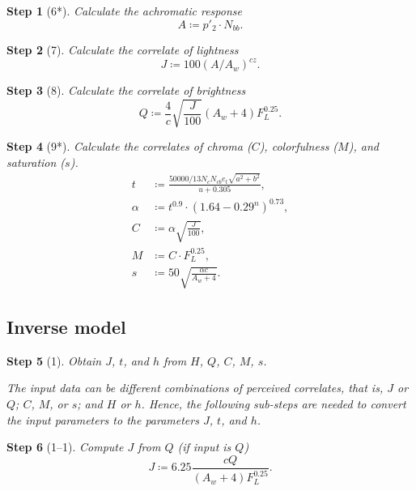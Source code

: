 \documentclass[twocolumn]{scrartcl}
\theoremstyle{named}
\newtheorem*{step}{Step}
\begin{document}
\begin{step}[6*]
Calculate the achromatic response
\[
  A\coloneqq p'_2 \cdot N_{bb}.
  \]
\end{step}

\begin{step}[7]
Calculate the correlate of lightness
\[
  J \coloneqq 100 {(A / A_w)}^{cz}.
\]
\end{step}

\begin{step}[8]
  Calculate the correlate of brightness
  \[
    Q \coloneqq \frac{4}{c} \sqrt{\frac{J}{100}} (A_w+4) F_L^{0.25}.
    \]
\end{step}

\begin{step}[9*]
Calculate the correlates of chroma ($C$), colorfulness ($M$), and saturation
  ($s$).
\begin{align*}
  t&\coloneqq \frac{50000/13 N_c N_{cb} e_t \sqrt{a^2 + b^2}}{u + 0.305},\\
  \alpha&\coloneqq t^{0.9} \cdot {(1.64 - 0.29^n)}^{0.73},\\
  C&\coloneqq \alpha \sqrt{\frac{J}{100}},\\
  M&\coloneqq C\cdot F_L^{0.25},\\
  s &\coloneqq 50 \sqrt{\frac{\alpha c}{A_w + 4}}.
\end{align*}
\end{step}

\subsection{Inverse model}

\begin{step}[1]
  Obtain $J$, $t$, and $h$ from $H$, $Q$, $C$, $M$, $s$.

  The input data can be different combinations of perceived correlates, that
  is, $J$ or $Q$; $C$, $M$, or $s$; and $H$ or $h$. Hence, the following
  sub-steps are needed to convert the input parameters to the parameters $J$,
  $t$, and $h$.
\end{step}

\begin{step}[1--1]
Compute $J$ from $Q$ (if input is $Q$)
\[
  J\coloneqq 6.25 \frac{cQ}{(A_w+4) F_L^{0.25}}.
\]
\end{step}
\end{document}
